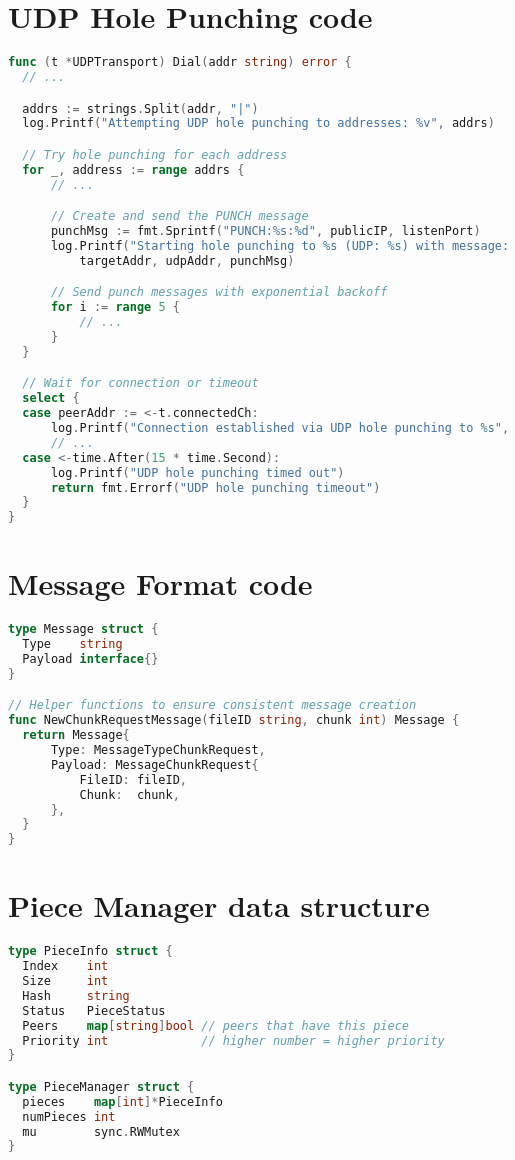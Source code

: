 \documentclass[12pt,a4paper]{report}
\begin{document}
\section{UDP Hole Punching code}
\begin{lstlisting}[language=Go, caption={UDP Hole Punch Implementation}, label={lst:udp-holepunch}]
func (t *UDPTransport) Dial(addr string) error {
  // ...

  addrs := strings.Split(addr, "|")
  log.Printf("Attempting UDP hole punching to addresses: %v", addrs)

  // Try hole punching for each address
  for _, address := range addrs {
      // ...

      // Create and send the PUNCH message
      punchMsg := fmt.Sprintf("PUNCH:%s:%d", publicIP, listenPort)
      log.Printf("Starting hole punching to %s (UDP: %s) with message: %s",
          targetAddr, udpAddr, punchMsg)

      // Send punch messages with exponential backoff
      for i := range 5 {
          // ...
      }
  }

  // Wait for connection or timeout
  select {
  case peerAddr := <-t.connectedCh:
      log.Printf("Connection established via UDP hole punching to %s", peerAddr)
      // ...
  case <-time.After(15 * time.Second):
      log.Printf("UDP hole punching timed out")
      return fmt.Errorf("UDP hole punching timeout")
  }
}
\end{lstlisting}

\section{Message Format code}
\begin{lstlisting}[language=Go, caption={Message Format}, label={lst:message-format}]
type Message struct {
  Type    string
  Payload interface{}
}

// Helper functions to ensure consistent message creation
func NewChunkRequestMessage(fileID string, chunk int) Message {
  return Message{
      Type: MessageTypeChunkRequest,
      Payload: MessageChunkRequest{
          FileID: fileID,
          Chunk:  chunk,
      },
  }
}
\end{lstlisting}

\section{Piece Manager data structure}
\begin{lstlisting}[language=Go, caption={Piece manager code}, label={lst:piece-info}]
type PieceInfo struct {
  Index    int
  Size     int
  Hash     string
  Status   PieceStatus
  Peers    map[string]bool // peers that have this piece
  Priority int             // higher number = higher priority
}

type PieceManager struct {
  pieces    map[int]*PieceInfo
  numPieces int
  mu        sync.RWMutex
}
\end{lstlisting}
\end{document}
